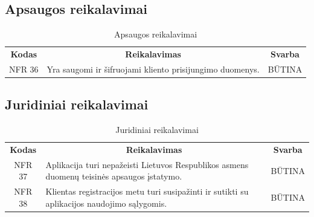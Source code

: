 \documentclass{VUMIFPSkursinis}
\begin{document}
{{{{{\begin{center}
\end{center}

\subsection{Apsaugos reikalavimai}
\begin{center}
	\begin{table}[H]
	\caption{Apsaugos reikalavimai}
	\begin{tabular}{|p{2cm}|p{}|p{}|}
	\hline
	    \rowcolor{lightgray}
		\multicolumn{3}{|c|}{Apsaugos reikalavimai}\\
		
	\hline
		\multicolumn{1}{|c|}{{\bfseries Kodas}}&
		\multicolumn{1}{|c|}{{\bfseries Reikalavimas}}&
		\multicolumn{1}{|c|}{{\bfseries Svarba}}\\
	\hline 	
		\multicolumn{1}{|c|}{NFR 36}&
		{Yra saugomi ir šifruojami kliento prisijungimo duomenys.}&
		\multicolumn{1}{|c|}{BŪTINA}\\	
	
	\hline 	
	\end{tabular}
	
	\label{table:Apsaugosreikalavimai}
	\end{table}

\end{center}

\subsection{Juridiniai reikalavimai}
\begin{center}
	\begin{table}[H]
	\caption{Juridiniai reikalavimai}
	\begin{tabular}{|p{2cm}|p{}|p{}|}
	\hline
	    \rowcolor{lightgray}
		\multicolumn{3}{|c|}{Juridiniai reikalavimai}\\
		
	\hline
		\multicolumn{1}{|c|}{{\bfseries Kodas}}&
		\multicolumn{1}{|c|}{{\bfseries Reikalavimas}}&
		\multicolumn{1}{|c|}{{\bfseries Svarba}}\\
	\hline 	
		\multicolumn{1}{|c|}{NFR 37}&
		{Aplikacija turi nepažeisti Lietuvos Respublikos asmens duomenų teisinės apsaugos įstatymo.}&
		\multicolumn{1}{|c|}{BŪTINA}\\	
	
	\hline 	
		\multicolumn{1}{|c|}{NFR 38}&
		{Klientas registracijos metu turi susipažinti ir sutikti su aplikacijos naudojimo sąlygomis.}&
		\multicolumn{1}{|c|}{BŪTINA}\\	
	

\end{tabular}
\end{table}
\end{center}}}}}}
\end{document}
